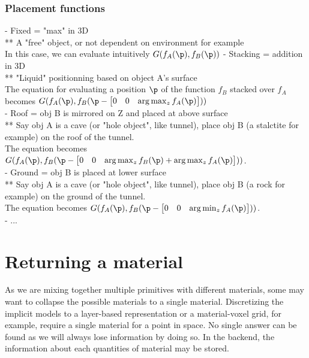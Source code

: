 \subsubsection{Placement functions}
- Fixed = "max" in 3D \\
** A "free" object, or not dependent on environment for example \\
In this case, we can evaluate intuitively $G(f_A(\p), f_B(\p))$
- Stacking = addition in 3D \\
** "Liquid" positionning based on object A's surface \\
The equation for evaluating a position $\p$ of the function $f_B$ stacked over $f_A$ becomes $G(f_A(\p), f_B(\p - \begin{bmatrix}0 & 0 & \arg \max_z f_A(\p)\end{bmatrix}))$ \\
- Roof = obj B is mirrored on Z and placed at above surface \\
** Say obj A is a cave (or "hole object", like tunnel), place obj B (a stalctite for example) on the roof of the tunnel. \\
The equation becomes $G(f_A(\p), f_B(\p - \begin{bmatrix}0 & 0 & \arg \max_z f_B(\p) + \arg \max_z f_A(\p)\end{bmatrix}))$. \\
- Ground = obj B is placed at lower surface \\
** Say obj A is a cave (or "hole object", like tunnel), place obj B (a rock for example) on the ground of the tunnel. \\
The equation becomes $G(f_A(\p), f_B(\p - \begin{bmatrix}0 & 0 & \arg \min_z f_A(\p)\end{bmatrix}))$. \\
- ...

\section{Returning a material}
As we are mixing together multiple primitives with different materials, some may want to collapse the possible materials to a single material. Discretizing the implicit models to a layer-based representation or a material-voxel grid, for example, require a single material for a point in space. No single answer can be found as we will always lose information by doing so. In the backend, the information about each quantities of material may be stored.

